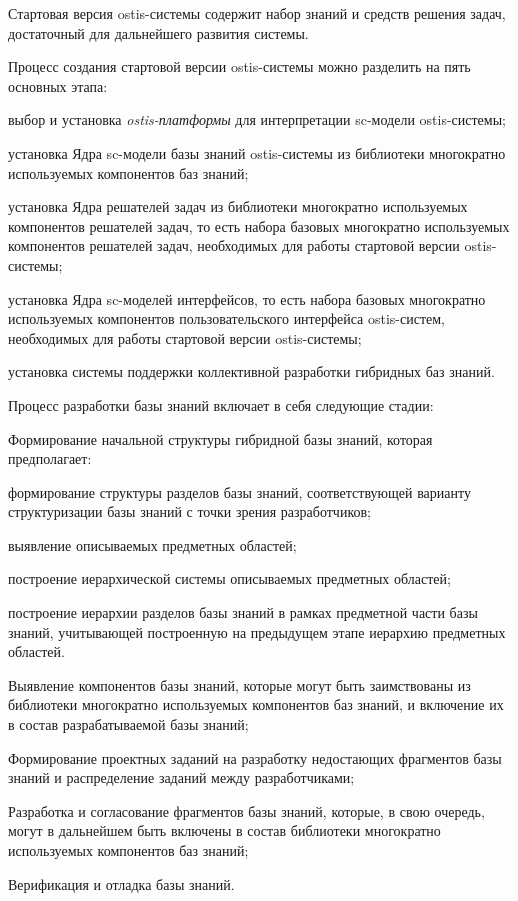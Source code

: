 Стартовая версия ostis-системы содержит набор знаний и средств решения задач, достаточный для дальнейшего развития системы.

Процесс создания стартовой версии ostis-системы можно разделить на пять основных этапа:
\begin{textitemize}
\item выбор и установка \textit{ostis-платформы} для интерпретации sc-модели ostis-системы;

\item установка Ядра sc-модели базы знаний ostis-системы из библиотеки многократно используемых компонентов баз знаний;

\item установка Ядра решателей задач из библиотеки многократно используемых компонентов решателей задач, то есть набора базовых многократно используемых компонентов решателей задач, необходимых для работы стартовой версии ostis-системы;

\item установка Ядра sc-моделей интерфейсов, то есть набора базовых многократно используемых компонентов пользовательского интерфейса ostis-систем, необходимых для работы стартовой версии ostis-системы;

\item установка системы поддержки коллективной разработки гибридных баз знаний.
\end{textitemize}

Процесс разработки базы знаний включает в себя следующие стадии:
\begin{textitemize}
	\item Формирование начальной структуры гибридной базы знаний, которая предполагает:
		\begin{textitemize}
			\item  формирование структуры разделов базы знаний, соответствующей варианту структуризации базы знаний с точки зрения разработчиков;
			\item выявление описываемых предметных областей;
			\item построение иерархической системы описываемых предметных областей;
			\item построение иерархии разделов базы знаний в рамках предметной	части базы знаний, учитывающей построенную на предыдущем этапе иерархию предметных областей.
		\end{textitemize}
	\item Выявление компонентов базы знаний, которые могут быть заимствованы из библиотеки многократно используемых компонентов баз знаний, и включение их в состав разрабатываемой базы знаний;
	\item Формирование проектных заданий на разработку недостающих фрагментов базы знаний и распределение заданий между разработчиками;
	\item Разработка и согласование фрагментов базы знаний, которые, в свою	очередь, могут в дальнейшем быть включены в состав библиотеки многократно используемых компонентов баз знаний;
	\item Верификация и отладка базы знаний.
\end{textitemize}

